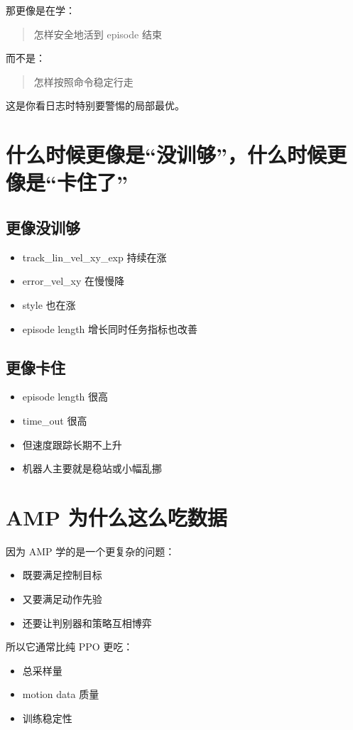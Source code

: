 \documentclass[11pt,a4paper]{article}
\begin{document}
那更像是在学：
\begin{quote}
怎样安全地活到 episode 结束
\end{quote}

而不是：
\begin{quote}
怎样按照命令稳定行走
\end{quote}

这是你看日志时特别要警惕的局部最优。

\section{什么时候更像是“没训够”，什么时候更像是“卡住了”}
\subsection*{更像没训够}
\begin{itemize}
\item track\_lin\_vel\_xy\_exp 持续在涨
\item error\_vel\_xy 在慢慢降
\item style 也在涨
\item episode length 增长同时任务指标也改善
\end{itemize}

\subsection*{更像卡住}
\begin{itemize}
\item episode length 很高
\item time\_out 很高
\item 但速度跟踪长期不上升
\item 机器人主要就是稳站或小幅乱挪
\end{itemize}

\section{AMP 为什么这么吃数据}
因为 AMP 学的是一个更复杂的问题：
\begin{itemize}
\item 既要满足控制目标
\item 又要满足动作先验
\item 还要让判别器和策略互相博弈
\end{itemize}

所以它通常比纯 PPO 更吃：
\begin{itemize}
\item 总采样量
\item motion data 质量
\item 训练稳定性
\end{itemize}
\end{document}
